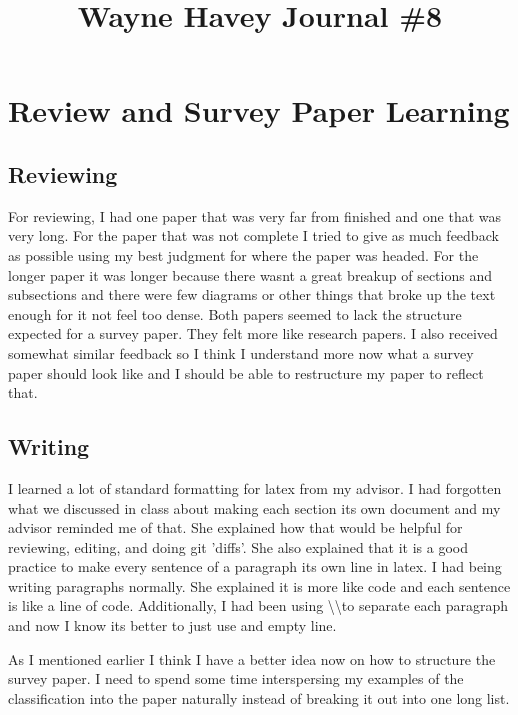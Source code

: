 \documentclass[conference]{IEEEtran}
\begin{document}
\title{Wayne Havey Journal \#8\\
}

\author{
}

\maketitle

\section{Review and Survey Paper Learning}
\subsection{Reviewing}
For reviewing, I had one paper that was very far from finished and one that was very long. 
For the paper that was not complete I tried to give as much feedback as possible using my best judgment for where the paper was headed.
For the longer paper it was longer because there wasnt a great breakup of sections and subsections and there were few diagrams or other things that broke up the text enough for it not feel too dense. 
Both papers seemed to lack the structure expected for a survey paper. 
They felt more like research papers.
I also received somewhat similar feedback so I think I understand more now what a survey paper should look like and I should be able to restructure my paper to reflect that. 

\subsection{Writing}
I learned a lot of standard formatting for latex from my advisor.
I had forgotten what we discussed in class about making each section its own document and my advisor reminded me of that.
She explained how that would be helpful for reviewing, editing, and doing git 'diffs'. 
She also explained that it is a good practice to make every sentence of a paragraph its own line in latex.
I had being writing paragraphs normally.
She explained it is more like code and each sentence is like a line of code. 
Additionally, I had been using \textbackslash\textbackslash to separate each paragraph and now I know its better to just use and empty line.

As I mentioned earlier I think I have a better idea now on how to structure the survey paper. 
I need to spend some time interspersing my examples of the classification into the paper naturally instead of breaking it out into one long list.
\end{document}
